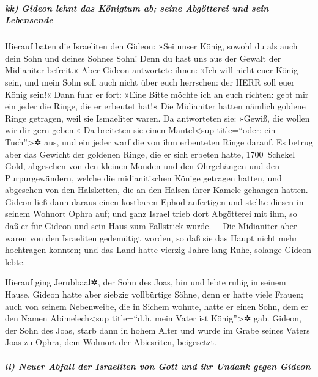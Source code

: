 \hypertarget{kk-gideon-lehnt-das-kuxf6nigtum-ab-seine-abguxf6tterei-und-sein-lebensende}{%
\subparagraph{kk) Gideon lehnt das Königtum ab; seine Abgötterei und
sein
Lebensende}\label{kk-gideon-lehnt-das-kuxf6nigtum-ab-seine-abguxf6tterei-und-sein-lebensende}}

Hierauf baten die Israeliten den Gideon: »Sei unser
König, sowohl du als auch dein Sohn und deines Sohnes Sohn! Denn du hast
uns aus der Gewalt der Midianiter befreit.« Aber Gideon
antwortete ihnen: »Ich will nicht euer König sein, und mein Sohn soll
auch nicht über euch herrschen: der HERR soll euer König sein!«
Dann fuhr er fort: »Eine Bitte möchte ich an euch
richten: gebt mir ein jeder die Ringe, die er erbeutet hat!« Die
Midianiter hatten nämlich goldene Ringe getragen, weil sie Ismaeliter
waren. Da antworteten sie: »Gewiß, die wollen wir dir
gern geben.« Da breiteten sie einen Mantel\textless sup title=``oder:
ein Tuch''\textgreater✲ aus, und ein jeder warf die von ihm erbeuteten
Ringe darauf. Es betrug aber das Gewicht der goldenen
Ringe, die er sich erbeten hatte, 1700~Schekel Gold, abgesehen von den
kleinen Monden und den Ohrgehängen und den Purpurgewändern, welche die
midianitischen Könige getragen hatten, und abgesehen von den Halsketten,
die an den Hälsen ihrer Kamele gehangen hatten. Gideon
ließ dann daraus einen kostbaren Ephod anfertigen und stellte diesen in
seinem Wohnort Ophra auf; und ganz Israel trieb dort Abgötterei mit ihm,
so daß er für Gideon und sein Haus zum Fallstrick wurde.~--
Die Midianiter aber waren von den Israeliten gedemütigt
worden, so daß sie das Haupt nicht mehr hochtragen konnten; und das Land
hatte vierzig Jahre lang Ruhe, solange Gideon lebte.

Hierauf ging Jerubbaal✲, der Sohn des Joas, hin und lebte
ruhig in seinem Hause. Gideon hatte aber siebzig
vollbürtige Söhne, denn er hatte viele Frauen; auch von
seinem Nebenweibe, die in Sichem wohnte, hatte er einen Sohn, dem er den
Namen Abimelech\textless sup title=``d.h. mein Vater ist
König''\textgreater✲ gab. Gideon, der Sohn des Joas,
starb dann in hohem Alter und wurde im Grabe seines Vaters Joas zu
Ophra, dem Wohnort der Abiesriten, beigesetzt.

\hypertarget{ll-neuer-abfall-der-israeliten-von-gott-und-ihr-undank-gegen-gideon}{%
\subparagraph{ll) Neuer Abfall der Israeliten von Gott und ihr Undank
gegen
Gideon}\label{ll-neuer-abfall-der-israeliten-von-gott-und-ihr-undank-gegen-gideon}}

